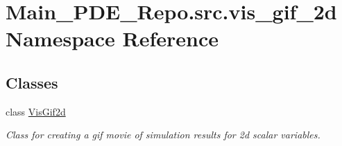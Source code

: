 \hypertarget{namespaceMain__PDE__Repo_1_1src_1_1vis__gif__2d}{}\section{Main\+\_\+\+P\+D\+E\+\_\+\+Repo.\+src.\+vis\+\_\+gif\+\_\+2d Namespace Reference}
\label{namespaceMain__PDE__Repo_1_1src_1_1vis__gif__2d}
\subsection*{Classes}
\begin{DoxyCompactItemize}
\item 
class \hyperlink{classMain__PDE__Repo_1_1src_1_1vis__gif__2d_1_1VisGif2d}{Vis\+Gif2d}
\begin{DoxyCompactList}\small\item\em Class for creating a gif movie of simulation results for 2d scalar variables. \end{DoxyCompactList}\end{DoxyCompactItemize}
